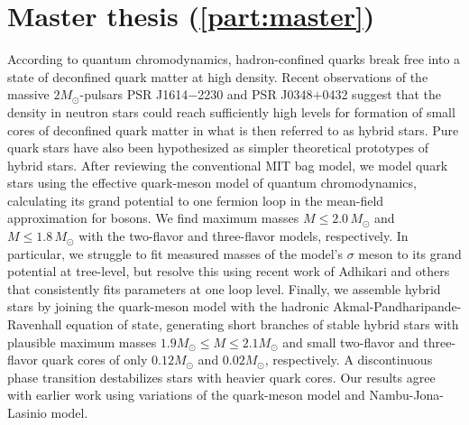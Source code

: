 \section*{Master thesis (\cref{part:master})}

According to quantum chromodynamics,
hadron-confined quarks break free into a state of deconfined quark matter at high density.
Recent observations of the massive $2 M_\odot$-pulsars PSR J1614$-$2230 and PSR J0348$+$0432
suggest that the density in neutron stars could reach sufficiently high levels
for formation of small cores of deconfined quark matter in what is then referred to as hybrid stars.
Pure quark stars have also been hypothesized as simpler theoretical prototypes of hybrid stars.
After reviewing the conventional MIT bag model,
we model quark stars using the effective quark-meson model of quantum chromodynamics,
calculating its grand potential to one fermion loop in the mean-field approximation for bosons.
We find maximum masses $M \leq 2.0 \, M_\odot$ and $M \leq 1.8 \, M_\odot$ with the two-flavor and three-flavor models, respectively.
In particular, we struggle to fit measured masses 
of the model's $\sigma$ meson to its grand potential at tree-level,
but resolve this using recent work of Adhikari and others that consistently fits parameters at one loop level.
Finally, we assemble hybrid stars by joining the quark-meson model with the hadronic Akmal-Pandharipande-Ravenhall equation of state,
generating short branches of stable hybrid stars with plausible maximum masses $1.9 M_\odot \leq M \leq 2.1 M_\odot$
and small two-flavor and three-flavor quark cores of only $0.12 M_\odot$ and $0.02 M_\odot$, respectively.
A discontinuous phase transition destabilizes stars with heavier quark cores.
Our results agree with earlier work using variations of the quark-meson model and Nambu-Jona-Lasinio model.
